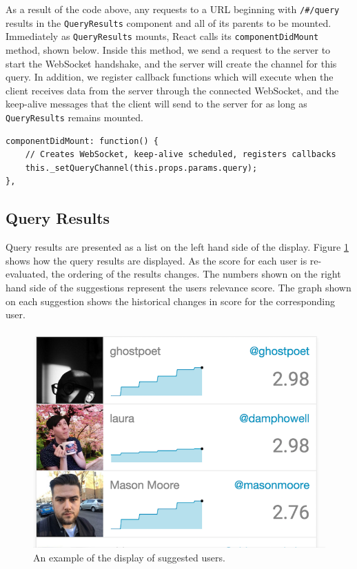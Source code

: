 \documentclass{l4proj}
\newcommand{\code}[1]{\texttt{#1}}
\begin{document}
As a result of the code above, any requests to a URL beginning with \code{/\#/query} results in the \code{QueryResults} component and all of its parents to be mounted. Immediately as \code{QueryResults} mounts, React calls its \code{componentDidMount} method, shown below. Inside this method, we send a request to the server to start the WebSocket handshake, and the server will create the channel for this query. In addition, we register callback functions which will execute when the client receives data from the server through the connected WebSocket, and the keep-alive messages that the client will send to the server for as long as \code{QueryResults} remains mounted.

\begin{lstlisting}[caption=The method called by React when a new component mounts.]
componentDidMount: function() {
    // Creates WebSocket, keep-alive scheduled, registers callbacks
    this._setQueryChannel(this.props.params.query);
},
\end{lstlisting}
        
        \subsection{Query Results}
        Query results are presented as a list on the left hand side of the display. Figure \ref{queryresults} shows how the query results are displayed. As the score for each user is re-evaluated, the ordering of the results changes. The numbers shown on the right hand side of the suggestions represent the users relevance score. The graph shown on each suggestion shows the historical changes in score for the corresponding user.
        
\begin{figure}
\centering
\includegraphics[scale=0.9]{queryresults.png}
\caption{An example of the display of suggested users.}
\label{queryresults}
\end{figure} 
        
\end{document}
